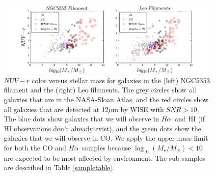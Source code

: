 \documentclass[11pt, preprint]{aastex}
\newcommand{\ha}{$H\alpha$}
\newcommand{\sers}{{\it S\'{e}rsic}}
\begin{document}




\begin{figure}[h]
\includegraphics[width=\textwidth]{sample.png}
\caption{\small $NUV-r$ color versus stellar mass for galaxies 
  in the (left) NGC5353 filament and the (right) Leo filaments.
The grey circles show all galaxies that are in the
NASA-Sloan Atlas, and the red circles show all galaxies that are
detected at 12$\mu$m by WISE with $SNR > 10$. 
The blue dots show galaxies that we will observe in \ha \ and HI (if
HI observations don't already exist), and the green
dots show the galaxies that we will observe in CO.  We apply the upper-mass
limit for both the CO and \ha \ samples because
$\log_{10}(M_\star/M_\odot) < 10$ are expected to be most affected by
environment.  The sub-samples are described in Table \ref{sampletable}.}
\label{sample}
\end{figure}
\end{document}
